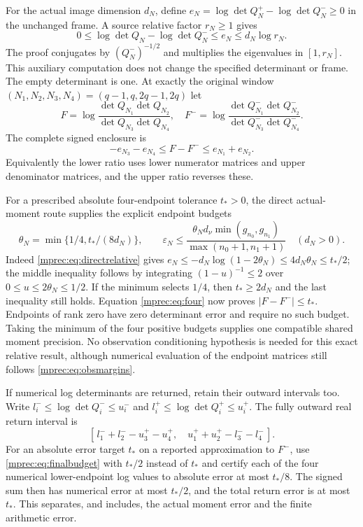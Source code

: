 \documentclass[11pt]{article}
\begin{document}
For the actual image dimension $d_N$, define
$e_N=\log\det Q_N^+-\log\det Q_N^-\ge0$ in the unchanged
frame. A source relative factor $r_N\ge1$ gives
\begin{equation}\label{mprec:eq:logbound}
 0\le\log\det Q_N-\log\det Q_N^-\le e_N\le d_N\log r_N.
\end{equation}
The proof conjugates by $(Q_N^-)^{-1/2}$ and multiplies the
eigenvalues in $[1,r_N]$. This auxiliary computation does not
change the specified determinant or frame. The empty determinant
is one. At exactly the original window
$(N_1,N_2,N_3,N_4)=(q-1,q,2q-1,2q)$ let
\[
 F=\log\frac{\det Q_{N_1}\det Q_{N_2}}
                   {\det Q_{N_3}\det Q_{N_4}},\quad
 F^-=\log\frac{\det Q_{N_1}^-\det Q_{N_2}^-}
                     {\det Q_{N_3}^-\det Q_{N_4}^-}.
\]
The complete signed enclosure is
\begin{equation}\label{mprec:eq:four}
 \boxed{-e_{N_3}-e_{N_4}\le F-F^-
                         \le e_{N_1}+e_{N_2}.}
\end{equation}
Equivalently the lower ratio uses lower numerator matrices and
upper denominator matrices, and the upper ratio reverses these.

For a prescribed absolute four-endpoint tolerance $t_*>0$, the
direct actual-moment route supplies the explicit endpoint budgets
\begin{equation}\label{mprec:eq:finalbudget}
 \boxed{\theta_N=\min\{1/4,t_*/(8d_N)\},\qquad
 \varepsilon_N\le
 \frac{\theta_Nd_\nu\min(g_{n_0},g_{n_1})}
      {\max(n_0+1,n_1+1)}\quad(d_N>0).}
\end{equation}
Indeed \eqref{mprec:eq:directrelative} gives
$e_N\le-d_N\log(1-2\theta_N)\le4d_N\theta_N\le t_*/2$;
the middle inequality follows by integrating
$(1-u)^{-1}\le2$ over $0\le u\le2\theta_N\le1/2$.
If the minimum selects $1/4$, then $t_*\ge2d_N$ and the last
inequality still holds. Equation \eqref{mprec:eq:four} now proves
$|F-F^-|\le t_*$. Endpoints of rank zero have zero determinant
error and require no such budget. Taking the minimum of the four
positive budgets supplies one compatible shared moment precision.
No observation conditioning hypothesis is needed for this exact
relative result, although numerical evaluation of the endpoint
matrices still follows \eqref{mprec:eq:obsmargins}.

If numerical log determinants are returned, retain their outward
intervals too. Write $l_i^-\le\log\det Q_i^-\le u_i^-$ and
$l_i^+\le\log\det Q_i^+\le u_i^+$. The fully outward real
return interval is
\[
 [\,l_1^-+l_2^--u_3^+-u_4^+,\quad
       u_1^++u_2^+-l_3^--l_4^-\,].
\]
For an absolute error target $t_*$ on a reported approximation
to $F^-$, use \eqref{mprec:eq:finalbudget} with $t_*/2$ instead of
$t_*$ and certify each of the four numerical lower-endpoint log
values to absolute error at most $t_*/8$. The signed sum then
has numerical error at most $t_*/2$, and the total return error
is at most $t_*$. This separates, and includes, the actual moment
error and the finite arithmetic error.
\end{document}
